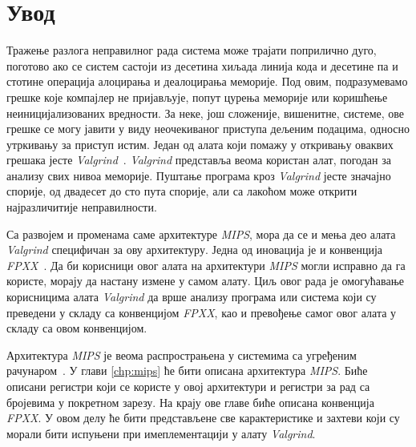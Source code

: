 \documentclass[12pt,oneside]{memoir}
\begin{document}
\frontmatter
\naslovna
\komisija
\apstrakt
\tableofcontents*

\mainmatter

\chapter{Увод}

\indent Тражење разлога неправилног рада система може трајати поприлично дуго, поготово ако се систем састоји из десетина хиљада линија кода и десетине па и стотине операција алоцирања и деалоцирања меморије. Под овим, подразумевамо грешке које компајлер не пријављује, попут цурења меморије или коришћење неиницијализованих вредности. За неке, још сложеније, вишенитне, системе, ове грешке се могу јавити у виду неочекиваног приступа дељеним подацима, односно утркивању за приступ истим. Један од алата који помажу у откривању оваквих грешака јесте \textit{Valgrind}~\cite{valgrindRef}. \textit{Valgrind} представља веома користан алат, погодан за анализу свих нивоа меморије. Пуштање програма кроз \textit{Valgrind} јесте значајно спорије, од двадесет до сто пута спорије, али са лакоћом може открити најразличитије неправилности.

\indent Са развојем и променама саме архитектуре \textit{MIPS}, мора да се и мења део алата \textit{Valgrind} специфичан за ову архитектуру. Једна од иновација је и конвенција \textit{FPXX}~\cite{fpxxRef}. Да би корисници овог алата на архитектури \textit{MIPS} могли исправно да га користе, морају да настану измене у самом алату. Циљ овог рада је омогућавање корисницима алата \textit{Valgrind} да врше анализу програма или система који су преведени у складу са конвенцијом \textit{FPXX}, као и превођење самог овог алата у складу са овом конвенцијом.

\indent Архитектура \textit{MIPS} је веома распрострањена у системима са угређеним рачунаром~\cite{SeeMIPSRun}. У глави \ref{chp:mips}  ће бити описана архитектура \textit{MIPS}. Биће описани регистри који се користе у овој архитектури и регистри за рад са бројевима у покретном зарезу. На крају ове главе биће описана конвенција \textit{FPXX}. У овом делу ће бити представљене све карактеристике и захтеви који су морали бити испуњени при имеплементацији у алату \textit{Valgrind}.
\end{document}
